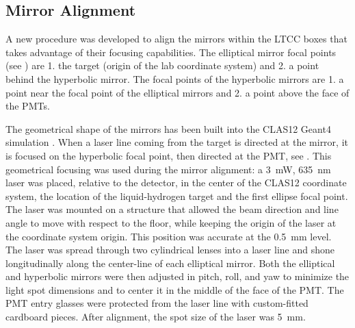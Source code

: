 
\subsection{Mirror Alignment}

A new procedure was developed to align the mirrors within the LTCC boxes that takes advantage of their focusing capabilities.
The elliptical mirror focal points (see ) are 1. the target (origin of the lab coordinate system)
and 2. a point behind the hyperbolic mirror. The focal points of the hyperbolic mirrors are 1. a point near the focal point of the elliptical mirrors and
2. a point above the face of the PMTs.

The geometrical shape of the mirrors has been built into the CLAS12 Geant4 simulation \cite{sim-nim}.
When a laser line coming from the target is directed at the mirror,
it is focused on the hyperbolic focal point, then directed at the PMT, see .
This geometrical focusing was used during the mirror alignment: a 3~mW, 635~nm laser was placed, relative to the
detector,
in the center of the CLAS12 coordinate system, the location of the liquid-hydrogen target and the first ellipse focal point.
The laser was mounted on a structure that allowed the beam direction and line angle to move with respect to the floor, while keeping the origin of the laser at the coordinate system origin.
This position was accurate at the 0.5~mm level. The laser was spread through two cylindrical lenses into a laser line
and shone
longitudinally along the center-line of each elliptical mirror. Both the elliptical and hyperbolic mirrors were then
adjusted in pitch, roll, and yaw to minimize the light spot dimensions and to center it in the middle of the face of the PMT.
The PMT entry glasses were protected from the laser line with custom-fitted cardboard pieces. After alignment, the spot size of the laser was 5~mm.

